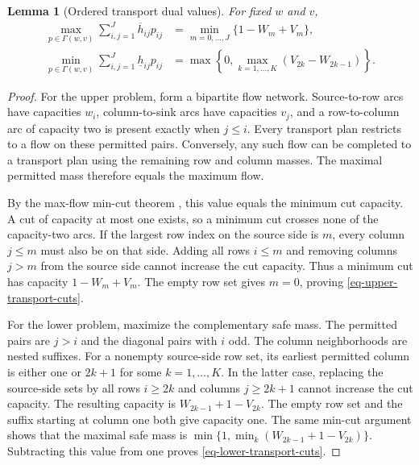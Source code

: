 \documentclass[review,11pt,3p,authoryear,nopreprintline]{elsarticle}
\newtheorem{lemma}{Lemma}
\begin{document}
\begin{lemma}[Ordered transport dual values]
  \label{lem-ordered-transport}
  For fixed $w$ and $v$,
  \begin{align}
    \max_{p\in\Gamma(w,v)}\sum_{i,j=1}^J\overline h_{ij}p_{ij}
    &=\min_{m=0,\ldots,J}\{1-W_m+V_m\},
    \label{eq-upper-transport-cuts}\\
    \min_{p\in\Gamma(w,v)}\sum_{i,j=1}^J\underline h_{ij}p_{ij}
    &=\max\left\{0,\max_{k=1,\ldots,K}(V_{2k}-W_{2k-1})\right\}.
    \label{eq-lower-transport-cuts}
  \end{align}
\end{lemma}
\begin{proof}
  For the upper problem, form a bipartite flow network. Source-to-row arcs have capacities $w_i$, column-to-sink arcs have capacities $v_j$, and a row-to-column arc of capacity two is present exactly when $j\le i$. Every transport plan restricts to a flow on these permitted pairs. Conversely, any such flow can be completed to a transport plan using the remaining row and column masses. The maximal permitted mass therefore equals the maximum flow.

  By the max-flow min-cut theorem \citep{F.F56}, this value equals the minimum cut capacity. A cut of capacity at most one exists, so a minimum cut crosses none of the capacity-two arcs. If the largest row index on the source side is $m$, every column $j\le m$ must also be on that side. Adding all rows $i\le m$ and removing columns $j>m$ from the source side cannot increase the cut capacity. Thus a minimum cut has capacity $1-W_m+V_m$. The empty row set gives $m=0$, proving \eqref{eq-upper-transport-cuts}.

  For the lower problem, maximize the complementary safe mass. The permitted pairs are $j>i$ and the diagonal pairs with $i$ odd. The column neighborhoods are nested suffixes. For a nonempty source-side row set, its earliest permitted column is either one or $2k+1$ for some $k=1,\ldots,K$. In the latter case, replacing the source-side sets by all rows $i\ge2k$ and columns $j\ge2k+1$ cannot increase the cut capacity. The resulting capacity is
  $W_{2k-1}+1-V_{2k}$. The empty row set and the suffix starting at column one both give capacity one. The same min-cut argument shows that the maximal safe mass is
  $\min\{1,\min_k(W_{2k-1}+1-V_{2k})\}$.
  Subtracting this value from one proves \eqref{eq-lower-transport-cuts}.
\end{proof}
\end{document}
